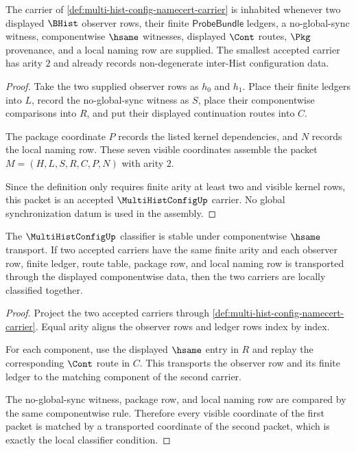 \begin{theorem}
\label{thm:multihistconfig-carrier-habitation}
The carrier of \autoref{def:multi-hist-config-namecert-carrier} is inhabited whenever two displayed $\BHist$ observer rows, their finite $\mathsf{ProbeBundle}$ ledgers, a no-global-sync witness, componentwise $\hsame$ witnesses, displayed $\Cont$ routes, $\Pkg$ provenance, and a local naming row are supplied. The smallest accepted carrier has arity $2$ and already records non-degenerate inter-Hist configuration data.
\end{theorem}
\begin{proof}
Take the two supplied observer rows as $h_0$ and $h_1$. Place their finite ledgers into $L$, record the no-global-sync witness as $S$, place their componentwise comparisons into $R$, and put their displayed continuation routes into $C$.

The package coordinate $P$ records the listed kernel dependencies, and $N$ records the local naming row. These seven visible coordinates assemble the packet $M=(H,L,S,R,C,P,N)$ with arity $2$.

Since the definition only requires finite arity at least two and visible kernel rows, this packet is an accepted $\MultiHistConfigUp$ carrier. No global synchronization datum is used in the assembly.
\end{proof}

\begin{theorem}
\label{thm:multihistconfig-componentwise-classifier-stability}
The $\MultiHistConfigUp$ classifier is stable under componentwise $\hsame$ transport. If two accepted carriers have the same finite arity and each observer row, finite ledger, route table, package row, and local naming row is transported through the displayed componentwise data, then the two carriers are locally classified together.
\end{theorem}
\begin{proof}
Project the two accepted carriers through \autoref{def:multi-hist-config-namecert-carrier}. Equal arity aligns the observer rows and ledger rows index by index.

For each component, use the displayed $\hsame$ entry in $R$ and replay the corresponding $\Cont$ route in $C$. This transports the observer row and its finite ledger to the matching component of the second carrier.

The no-global-sync witness, package row, and local naming row are compared by the same componentwise rule. Therefore every visible coordinate of the first packet is matched by a transported coordinate of the second packet, which is exactly the local classifier condition.
\end{proof}

